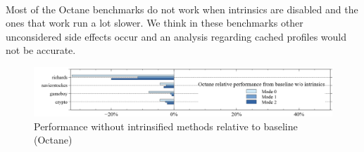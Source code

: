 \\
Most of the Octane benchmarks do not work when intrinsics are disabled and the ones that work run a lot slower. We think in these benchmarks other unconsidered side effects occur and an analysis regarding cached profiles would not be accurate.
\begin{figure}[ht]
  \begin{center}
    \centering
    \includegraphics[width=1.0\textwidth]{figures/octane_noi_variation.png}
    \caption{Performance without intrinsified methods relative to baseline (Octane)}
    \label{f:octane_noi_variation}
  \end{center}
\end{figure}
